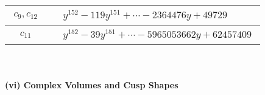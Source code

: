 \documentclass[1p]{elsarticle_modified}
\theoremstyle{definition}
\begin{document}
\begin{tabular}{m{50pt}|m{274pt}}
\hline $$\begin{aligned}c_{9},c_{12}\end{aligned}$$&$\begin{aligned}
&y^{152}-119 y^{151}+\cdots-2364476 y+49729
\end{aligned}$\\
\hline $$\begin{aligned}c_{11}\end{aligned}$$&$\begin{aligned}
&y^{152}-39 y^{151}+\cdots-5965053662 y+62457409
\end{aligned}$\\
\hline
\end{tabular}\\~\\
\newpage\flushleft \textbf{(vi) Complex Volumes and Cusp Shapes}
\end{document}
